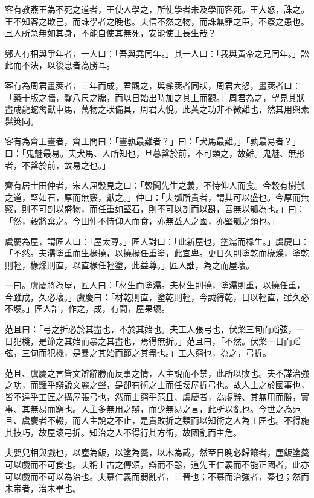 \begin{pinyinscope}
客有教燕王為不死之道者，王使人學之，所使學者未及學而客死。王大怒，誅之。王不知客之欺己，而誅學者之晚也。夫信不然之物，而誅無罪之臣，不察之患也。且人所急無如其身，不能自使其無死，安能使王長生哉？

鄭人有相與爭年者，一人曰：「吾與堯同年。」其一人曰：「我與黃帝之兄同年。」訟此而不決，以後息者為勝耳。

客有為周君畫莢者，三年而成，君觀之，與髹莢者同狀，周君大怒，畫莢者曰：「築十版之牆，鑿八尺之牖，而以日始出時加之其上而觀。」周君為之，望見其狀盡成龍蛇禽獸車馬，萬物之狀備具，周君大悅。此莢之功非不微難也，然其用與素髹筴同。

客有為齊王畫者，齊王問曰：「畫孰最難者？」曰：「犬馬最難。」「孰最易者？」曰：「鬼魅最易。夫犬馬、人所知也，旦暮罄於前，不可類之，故難。鬼魅、無形者，不罄於前，故易之也。」

齊有居士田仲者，宋人屈穀見之曰：「穀聞先生之義，不恃仰人而食。今穀有樹瓠之道，堅如石，厚而無竅，獻之。」仲曰：「夫瓠所貴者，謂其可以盛也。今厚而無竅，則不可剖以盛物，而任重如堅石，則不可以剖而以斟，吾無以瓠為也。」曰：「然，穀將棄之。今田仲不恃仰人而食，亦無益人之國，亦堅瓠之類也。」

虞慶為屋，謂匠人曰：「屋太尊。」匠人對曰：「此新屋也，塗濡而椽生。」虞慶曰：「不然。夫濡塗重而生椽撓，以撓椽任重塗，此宜卑。更日久則塗乾而椽燥，塗乾則輕，椽燥則直，以直椽任輕塗，此益尊。」匠人詘，為之而屋壞。

一曰。虞慶將為屋，匠人曰：「材生而塗濡。夫材生則撓，塗濡則重，以撓任重，今雖成，久必壞。」虞慶曰：「材乾則直，塗乾則輕，今誠得乾，日以輕直，雖久必不壞。」匠人詘，作之，成，有間，屋果壞。

范且曰：「弓之折必於其盡也，不於其始也。夫工人張弓也，伏檠三旬而蹈弦，一日犯機，是節之其始而暴之其盡也，焉得無折。」范且曰，「不然。伏檠一日而蹈弦，三旬而犯機，是暴之其始而節之其盡也。」工人窮也，為之，弓折。

范且、虞慶之言皆文辯辭勝而反事之情，人主說而不禁，此所以敗也。夫不謀治強之功，而豔乎辯說文麗之聲，是卻有術之士而任壞屋折弓也。故人主之於國事也，皆不達乎工匠之搆屋張弓也，然而士窮乎范且、虞慶者，為虛辭、其無用而勝，實事、其無易而窮也。人主多無用之辯，而少無易之言，此所以亂也。今世之為范且、虞慶者不輟，而人主說之不止，是貴敗折之類而以知術之人為工匠也。不得施其技巧，故屋壞弓折。知治之人不得行其方術，故國亂而主危。

夫嬰兒相與戲也，以塵為飯，以塗為羹，以木為胾，然至日晚必歸饟者，塵飯塗羹可以戲而不可食也。夫稱上古之傳頌，辯而不愨，道先王仁義而不能正國者，此亦可以戲而不可以為治也。夫慕仁義而弱亂者，三晉也；不慕而治強者，秦也；然而未帝者，治未畢也。


\end{pinyinscope}
